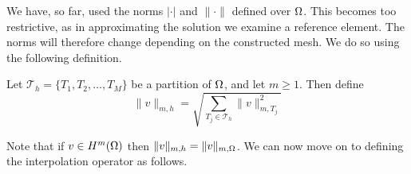 We have, so far, used the norms $|\cdot|$ and $\|\cdot\|$ defined over $\Omega$. 
This becomes too restrictive, as in approximating the solution we examine a 
reference element. The norms will therefore change depending on the constructed 
mesh. We do so using the following definition.
\begin{defn}{\quad}
    Let $\mathcal{T}_h = \{ T_1,T_2,\ldots,T_M\}$ be a partition of $\Omega$, and 
    let $m\geq 1$. Then define 
    \begin{equation*}
        \|v\|_{m,h} = \sqrt{\sum_{T_j\in \mathcal{T}_h}\|v\|^2_{m,T_j}}
    \end{equation*}
\end{defn}
Note that if $v\in H^m(\Omega)$ then $\|v\|_{m,h}=\|v\|_{m,\Omega}$. We can now move on to defining the interpolation operator as follows.